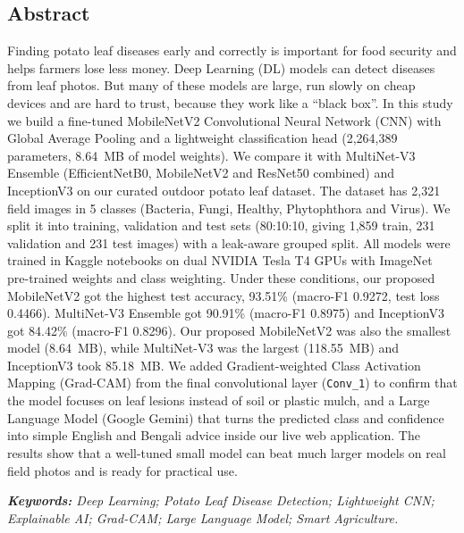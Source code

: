 \begin{center}
    \section*{Abstract}
\end{center}
Finding potato leaf diseases early and correctly is important for food security and helps farmers lose less money. Deep Learning (DL) models can detect diseases from leaf photos. But many of these models are large, run slowly on cheap devices and are hard to trust, because they work like a ``black box''. In this study we build a fine-tuned MobileNetV2 Convolutional Neural Network (CNN) with Global Average Pooling and a lightweight classification head (2,264,389 parameters, 8.64~MB of model weights). We compare it with MultiNet-V3 Ensemble (EfficientNetB0, MobileNetV2 and ResNet50 combined) and InceptionV3 on our curated outdoor potato leaf dataset. The dataset has 2,321 field images in 5 classes (Bacteria, Fungi, Healthy, Phytophthora and Virus). We split it into training, validation and test sets (80:10:10, giving 1,859 train, 231 validation and 231 test images) with a leak-aware grouped split. All models were trained in Kaggle notebooks on dual NVIDIA Tesla T4 GPUs with ImageNet pre-trained weights and class weighting. Under these conditions, our proposed MobileNetV2 got the highest test accuracy, 93.51\% (macro-F1 0.9272, test loss 0.4466). MultiNet-V3 Ensemble got 90.91\% (macro-F1 0.8975) and InceptionV3 got 84.42\% (macro-F1 0.8296). Our proposed MobileNetV2 was also the smallest model (8.64~MB), while MultiNet-V3 was the largest (118.55~MB) and InceptionV3 took 85.18~MB. We added Gradient-weighted Class Activation Mapping (Grad-CAM) from the final convolutional layer (\texttt{Conv\_1}) to confirm that the model focuses on leaf lesions instead of soil or plastic mulch, and a Large Language Model (Google Gemini) that turns the predicted class and confidence into simple English and Bengali advice inside our live web application. The results show that a well-tuned small model can beat much larger models on real field photos and is ready for practical use.

\vspace{5mm}

\textit{\textbf{Keywords:} Deep Learning; Potato Leaf Disease Detection; Lightweight CNN; Explainable AI; Grad-CAM; Large Language Model; Smart Agriculture.}
